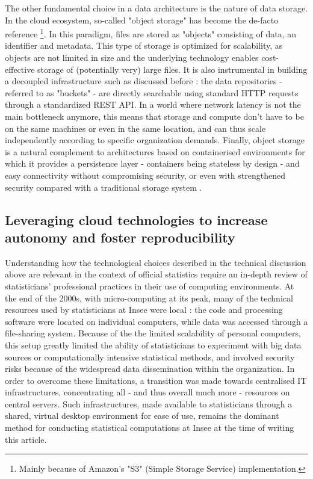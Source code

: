 
The other fundamental choice in a data architecture is the nature of data storage. In the cloud ecosystem, so-called "object storage" has become the de-facto reference \cite{samundiswary2017object} \footnote{Mainly because of Amazon's "S3" (Simple Storage Service) implementation.}. In this paradigm, files are stored as "objects" consisting of data, an identifier and metadata. This type of storage is optimized for scalability, as objects are not limited in size and the underlying technology enables cost-effective storage of (potentially very) large files. It is also instrumental in building a decoupled infrastructure such as discussed before : the data repositories - referred to as "buckets" - are directly searchable using standard HTTP requests through a standardized REST API. In a world where network latency is not the main bottleneck anymore, this means that storage and compute don't have to be on the same machines or even in the same location, and can thus scale independently according to specific organization demands. Finally, object storage is a natural complement to architectures based on containerised environments for which it provides a persistence layer - containers being stateless by design - and easy connectivity without compromising security, or even with strengthened security compared with a traditional storage system \cite{mesnier2003object}.

\subsection{Leveraging cloud technologies to increase autonomy and foster reproducibility}

Understanding how the technological choices described in the technical discussion above are relevant in the context of official statistics require an in-depth review of statisticians’ professional practices in their use of computing environments. At the end of the 2000s, with micro-computing at its peak, many of the technical resources used by statisticians at Insee were local : the code and processing software were located on individual computers, while data was accessed through a file-sharing system. Because of the the limited scalability of personal computers, this setup greatly limited the ability of statisticians to experiment with big data sources or computationally intensive statistical methods, and involved security risks because of the widespread data dissemination within the organization. In order to overcome these limitations, a transition was made towards centralised IT infrastructures, concentrating all - and thus overall much more - resources on central servers. Such infrastructures, made available to statisticians through a shared, virtual desktop environment for ease of use, remains the dominant method for conducting statistical computations at Insee at the time of writing this article.

